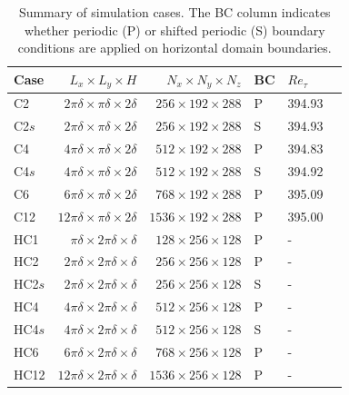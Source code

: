 		\begin{table}
			\begin{threeparttable}


			\caption{Summary of simulation cases. The BC column indicates whether periodic (P) or shifted periodic (S) boundary conditions are applied on horizontal domain boundaries. \label{tab:cases}
			} 
			\centering
			\begin{tabularx}{\textwidth}{Xrrlll}
				\hline \rule{0pt}{2.8ex}Case       	& $L_x \times L_y \times H$ 						& $N_x  \times N_y \times N_z$ 	& BC 	& $Re_\tau$ 	\\
				\hline \rule{0pt}{2.8ex}C2 		& $2\pi\delta \times \pi\delta \times 2\delta$  	& $256  \times 192 \times 288$ 	& P 	& 394.93 		 \\
				C2$s$	& $2\pi\delta \times \pi\delta \times 2\delta$  	& $256  \times 192 \times 288$ 	& S 	& 394.93 		 \\
				C4 		& $4\pi\delta \times \pi\delta \times 2\delta$  	& $512  \times 192 \times 288$ 	& P 	& 394.83 		 \\
				C4$s$  	& $4\pi\delta \times \pi\delta \times 2\delta$  	& $512  \times 192 \times 288$ 	& S 	& 394.92 		 \\
				C6 		& $6\pi\delta \times \pi\delta \times 2\delta$  	& $768  \times 192 \times 288$ 	& P 	& 395.09		 \\
				C12 		& $12\pi\delta \times \pi\delta \times 2\delta$  	& $1536 \times 192 \times 288$	& P 	& 395.00		 \\
				
				\hline \rule{0pt}{2.8ex}HC1  	& $\pi \delta \times 2\pi \delta \times \delta$ 	& $128 \times 256 \times 128$ 	& P 	& -				 \\
				HC2  	& $2\pi \delta \times 2\pi \delta \times \delta$ 	& $256 \times 256 \times 128$ 	& P 	& -				 \\
				HC2$s$  	& $2\pi \delta \times 2\pi \delta \times \delta$ 	& $256 \times 256 \times 128$ 	& S 	& -				 \\
				HC4  	& $4\pi \delta \times 2\pi \delta \times \delta$ 	& $512 \times 256 \times 128$ 	& P 	& -				 \\
				HC4$s$	& $4\pi \delta \times 2\pi \delta \times \delta$ 	& $512 \times 256 \times 128$ 	& S 	& -				 \\
				HC6  	& $6\pi \delta \times 2\pi \delta \times \delta$ 	& $768 \times 256 \times 128$ 	& P 	& -				 \\
				HC12 	& $12\pi \delta \times 2\pi \delta \times \delta$ 	& $1536 \times 256 \times 128$ 	& P 	& -				 \\
				\hline
			\end{tabularx}
		

\end{threeparttable}
\end{table}
